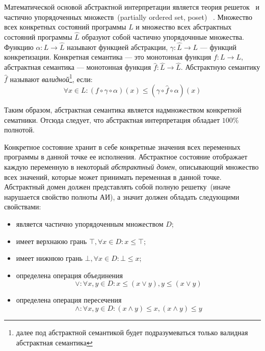 Математической основой абстрактной интерпретации является теория решеток~\cite{
lattice} и частично упорядоченных множеств~(partially ordered set, poset)
~\cite{poset}. Множество всех конкретных состояний программы $L$ и множество
всех абстрактных состояний программы $\hat{L}$ образуют собой частично 
упорядочнные множества. Функцию $\alpha: L \rightarrow \hat{L}$ называют 
функцией абстракции, $\gamma: \hat{L} \rightarrow L$ --- функций конкретизации.
Конкретная семантика --- это монотонная функция $f: L \rightarrow L$, 
абстрактная семантика --- монотонная функция $\hat{f}: \hat{L} \rightarrow \hat
{L}$. Абстрактную семантику $\hat{f}$ называют \emph{валидной}\footnote{далее
под абстрактной семантикой будет подразумеваться только валидная абстрактная
семантика}, если:
\begin{equation*}
\forall x \in L: (f \circ \gamma \circ \alpha)(x) \le (\gamma \circ \hat{f} 
\circ \alpha)(x)
\end{equation*}

Таким образом, абстрактная семантика является надмножеством конкретной 
сематники. Отсюда следует, что абстрактная интерпретация обладает $100\%$ полнотой.

Конкретное состояние хранит в себе конкретные значения всех переменных 
программы в данной точке ее исполнения. Абстрактное состояние отображает каждую
переменную в некоторый \emph{абстрактный домен}, описывающий множество всех
значений, которые может принимать переменная в данной точке. Абстрактный домен
должен представлять собой полную решетку~(иначе нарушается свойство полноты 
АИ), а значит должен обладать следующими свойствами:
\begin{itemize}
\item является частично упорядоченным множеством $D$;
\item имеет верхнаюю грань $\top, \forall x \in D: x \le \top$;
\item имеет нижнюю грань $\bot, \forall x \in D: \bot \le x$;
\item определена операция объединения
\begin{equation*}
\vee: \forall x, y \in D: x \le (x \vee y), y \le (x \vee y)
\end{equation*}
\item определена операция пересечения
\begin{equation*}
\wedge: \forall x, y \in D: (x \wedge y) \le x, (x \wedge y) \le y
\end{equation*}
\end{itemize}

